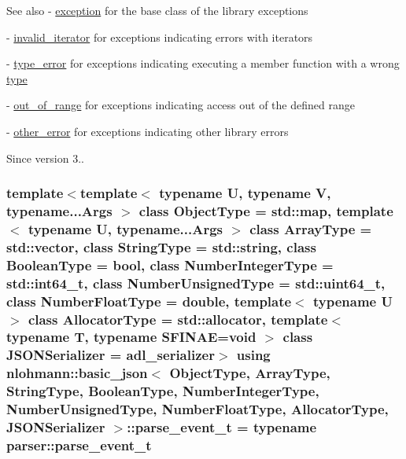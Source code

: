 \begin{DoxySeeAlso}{See also}
-\/ \hyperlink{classnlohmann_1_1basic__json_a9a0aced019cb1d65bb49703406c84970}{exception} for the base class of the library exceptions 

-\/ \hyperlink{classnlohmann_1_1basic__json_ac13d32f7cbd02d616e71d8dc30dadcbf}{invalid\+\_\+iterator} for exceptions indicating errors with iterators 

-\/ \hyperlink{classnlohmann_1_1basic__json_a4010e8e268fefd86da773c10318f2902}{type\+\_\+error} for exceptions indicating executing a member function with a wrong \hyperlink{classnlohmann_1_1basic__json_a2b2d781d7f2a4ee41bc0016e931cadf7}{type} 

-\/ \hyperlink{classnlohmann_1_1basic__json_a28f7c2f087274a0012eb7a2333ee1580}{out\+\_\+of\+\_\+range} for exceptions indicating access out of the defined range 

-\/ \hyperlink{classnlohmann_1_1basic__json_a3333a5a8714912adda33a35b369f7b3d}{other\+\_\+error} for exceptions indicating other library errors
\end{DoxySeeAlso}
\begin{DoxySince}{Since}
version 3.. 
\end{DoxySince}
\subsubsection[{\texorpdfstring{parse\+\_\+event\+\_\+t}{parse_event_t}}]{\setlength{\rightskip}{0pt plus 5cm}template$<$template$<$ typename U, typename V, typename...\+Args $>$ class Object\+Type = std\+::map, template$<$ typename U, typename...\+Args $>$ class Array\+Type = std\+::vector, class String\+Type  = std\+::string, class Boolean\+Type  = bool, class Number\+Integer\+Type  = std\+::int64\+\_\+t, class Number\+Unsigned\+Type  = std\+::uint64\+\_\+t, class Number\+Float\+Type  = double, template$<$ typename U $>$ class Allocator\+Type = std\+::allocator, template$<$ typename T, typename S\+F\+I\+N\+A\+E=void $>$ class J\+S\+O\+N\+Serializer = adl\+\_\+serializer$>$ using {\bf nlohmann\+::basic\+\_\+json}$<$ Object\+Type, Array\+Type, String\+Type, Boolean\+Type, Number\+Integer\+Type, Number\+Unsigned\+Type, Number\+Float\+Type, Allocator\+Type, J\+S\+O\+N\+Serializer $>$\+::{\bf parse\+\_\+event\+\_\+t} =  typename {\bf parser\+::parse\+\_\+event\+\_\+t}}\hypertarget{classnlohmann_1_1basic__json_aaceba2e4cf75fc983bb75c78c8742e65}{}\label{classnlohmann_1_1basic__json_aaceba2e4cf75fc983bb75c78c8742e65}


